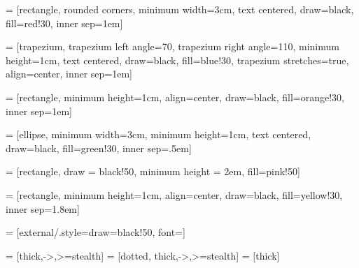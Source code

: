 \usepackage{tikz}
\usetikzlibrary{positioning, fit, backgrounds, shapes, arrows}

 = [rectangle, rounded corners, minimum width=3cm, text centered,
 draw=black, fill=red!30, inner sep=1em]

 = [trapezium, trapezium left angle=70, trapezium right angle=110, 
 minimum height=1cm, text centered, draw=black, fill=blue!30, trapezium stretches=true,
 align=center, inner sep=1em] 

 = [rectangle, minimum height=1cm, align=center,
      draw=black, fill=orange!30, inner sep=1em]

 = [ellipse, minimum width=3cm, minimum height=1cm, text centered, draw=black,
 fill=green!30, inner sep=.5em]

 = [rectangle, draw = black!50, minimum height = 2em, fill=pink!50]

 = [rectangle, minimum height=1cm, align=center, draw=black, fill=yellow!30, inner sep=1.8em]

 = [external/.style={draw=black!50}, font={\fontsize{13pt}{12}\selectfont}]

 = [thick,->,>=stealth]
 = [dotted, thick,->,>=stealth]
 = [thick]
